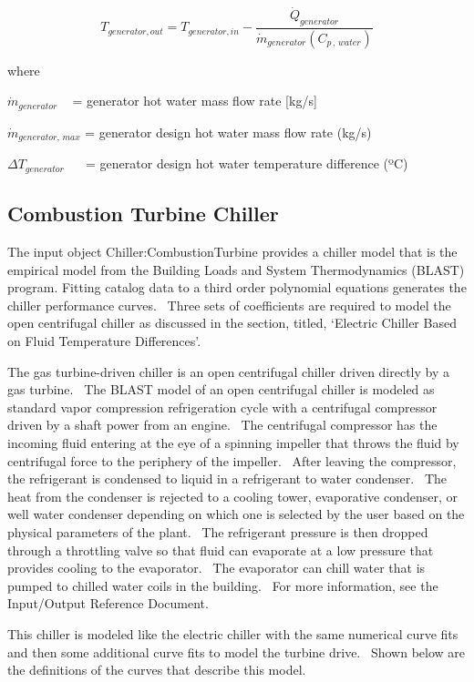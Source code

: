 \begin{equation}
{T_{generator,out}} = {T_{generator,in}} - \frac{{{{\dot Q}_{generator}}}}{{{{\dot m}_{generator}}\left( {{C_{p\,,\,water}}} \right)}}
\end{equation}

where

\({\dot m_{generator}}\) ~ = generator hot water mass flow rate {[}kg/s{]}

\({\dot m_{generator,\,max}}\) = generator design hot water mass flow rate (kg/s)

\(\Delta {T_{generator}}\) ~~ = generator design hot water temperature difference (ºC)

\subsection{Combustion Turbine Chiller}\label{combustion-turbine-chiller}

The input object Chiller:CombustionTurbine provides a chiller model that is the empirical model from the Building Loads and System Thermodynamics (BLAST) program. Fitting catalog data to a third order polynomial equations generates the chiller performance curves.~ Three sets of coefficients are required to model the open centrifugal chiller as discussed in the section, titled, `Electric Chiller Based on Fluid Temperature Differences'.

The gas turbine-driven chiller is an open centrifugal chiller driven directly by a gas turbine.~ The BLAST model of an open centrifugal chiller is modeled as standard vapor compression refrigeration cycle with a centrifugal compressor driven by a shaft power from an engine.~ The centrifugal compressor has the incoming fluid entering at the eye of a spinning impeller that throws the fluid by centrifugal force to the periphery of the impeller.~ After leaving the compressor, the refrigerant is condensed to liquid in a refrigerant to water condenser.~ The heat from the condenser is rejected to a cooling tower, evaporative condenser, or well water condenser depending on which one is selected by the user based on the physical parameters of the plant.~ The refrigerant pressure is then dropped through a throttling valve so that fluid can evaporate at a low pressure that provides cooling to the evaporator.~ The evaporator can chill water that is pumped to chilled water coils in the building.~ For more information, see the Input/Output Reference Document.

This chiller is modeled like the electric chiller with the same numerical curve fits and then some additional curve fits to model the turbine drive.~ Shown below are the definitions of the curves that describe this model.


